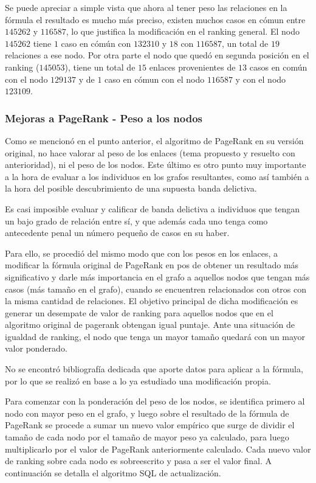 Se puede apreciar a simple vista que ahora al tener peso las relaciones en la fórmula el resultado es mucho más preciso, existen muchos casos en cómun entre $145262$ y $116587$, lo que justifica la modificación en el ranking general. El nodo $145262$ tiene $1$ caso en cómún con $132310$ y $18$ con $116587$, un total de $19$ relaciones a ese nodo. Por otra parte el nodo que quedó en segunda posición en el ranking ($145053$), tiene un total de $15$ enlaces provenientes de $13$ casos en común con el nodo $129137$ y de $1$ caso en cómun con el nodo $116587$ y con el nodo $123109$.

\subsubsection{Mejoras a PageRank - Peso a los nodos}

Como se mencionó en el punto anterior, el algoritmo de PageRank en su versión original, no hace valorar al peso de los enlaces (tema propuesto y resuelto con anterioridad), ni el peso de los nodos. Este último es otro punto muy importante a la hora de evaluar a los individuos en los grafos resultantes, como así también a la hora del posible descubrimiento de una supuesta banda delictiva.

Es casi imposible evaluar y calificar de banda delictiva a individuos que tengan un bajo grado de relación entre sí, y que además cada uno tenga como antecedente penal un número pequeño de casos en su haber.

Para ello, se procedió del mismo modo que con los pesos en los enlaces, a modificar la fórmula original de PageRank en pos de obtener un resultado más significativo y darle más importancia en el grafo a aquellos nodos que tengan más casos (más tamaño en el grafo), cuando se encuentren relacionados con otros con la misma cantidad de relaciones. El objetivo principal de dicha modificación es generar un desempate de valor de ranking para aquellos nodos que en el algoritmo original de pagerank obtengan igual puntaje. Ante una situación de igualdad de ranking, el nodo que tenga un mayor tamaño quedará con un mayor valor ponderado.

No se encontró bibliografía dedicada que aporte datos para aplicar a la fórmula, por lo que se realizó  en base a lo ya estudiado una modificación propia. 

Para comenzar con la ponderación del peso de los nodos, se identifica primero al nodo con mayor peso en el grafo, y luego sobre el resultado de la fórmula de PageRank se procede a sumar un nuevo valor empírico que surge de dividir el tamaño de cada nodo por el tamaño de mayor peso ya calculado, para luego multiplicarlo por el valor de PageRank anteriormente calculado. Cada nuevo valor de ranking sobre cada nodo es sobreescrito y pasa a ser el valor final. A continuación se detalla el algoritmo SQL de actualización.

